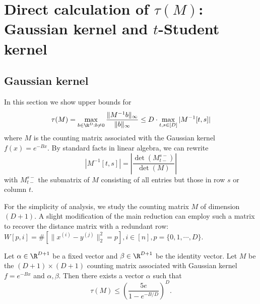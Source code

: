 \section{Direct calculation of $\tau(M)$: Gaussian kernel and $t$-Student kernel}
\subsection{Gaussian kernel}
In this section we show upper bounds for 
\[\tau(M) = \max_{b \in \R^D: b \ne 0} \frac{\|M^{-1}b\|_{\infty}}{\|b\|_{\infty}} \le D \cdot \max_{t, s \in [D]} |M^{-1}[t, s]|\]
where $M$ is the counting matrix associated with the Gaussian kernel $f(x) = e^{-Bx}$.
By standard facts in linear algebra, we can rewrite
\[|M^{-1}[t, s]| = \left|\frac{\det(M^{s-}_{t-})}{\det(M)}\right|\]
with $M_{t-}^{s-}$ the submatrix of $M$ consisting of all entries but those in row $s$ or column $t$.

For the simplicity of analysis, we study the counting matrix $M$ of dimension $(D+1)$. A slight modification of the main reduction can employ such a matrix to recover the distance matrix with a redundant row: $W[p, i] = \#[\|x^{(i)} - y^{(j)}\|_2^2 = p], i \in [n], p = \{0, 1, \cdots, D\}$.
\begin{theorem}
Let $\alpha \in \R^{D+1}$ be a fixed vector and $\beta \in \R^{D+1}$ be the identity vector.
Let $M$ be the $(D+1) \times (D+1)$ counting matrix associated with Gaussian kernel $f = e^{-Bx}$ and $\alpha, \beta$. Then there exists a vector $\alpha$ such that
\[\tau(M) \le \left(\frac{5e}{1 - e^{-B/D}}\right)^D.\]
\end{theorem}

